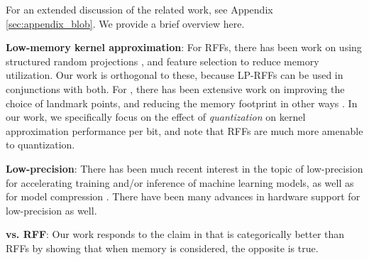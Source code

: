 For an extended discussion of the related work, see Appendix \ref{sec:appendix_blob}. We provide a brief overview here.

\textbf{Low-memory kernel approximation}: For RFFs, there has been work on using structured random projections \citep{fastfood,yu15,sphereRKS}, and feature selection \citep{sparseRKS, may2016} to reduce memory utilization. Our work is orthogonal to these, because LP-RFFs can be used in conjunctions with both. For \NystromNS, there has been extensive work on improving the choice of landmark points, and reducing the memory footprint in other ways \cite{ensemble09,fastpred14,meka14}. In our work, we specifically focus on the effect of \textit{quantization} on kernel approximation performance per bit, and note that RFFs are much more amenable to quantization. 

\textbf{Low-precision}: There has been much recent interest in the topic of low-precision for accelerating training and/or inference of machine learning models, as well as for model compression \citep{gupta15,hogwild15,hubara16,halp18,desa17,han15}.  There have been many advances in hardware support for low-precision as well\citep{tpu17,brainwave17}.

\textbf{\Nystrom vs. RFF}: Our work responds to the claim in \citet{nysvsrff12} that \Nystrom is categorically better than RFFs by showing that when memory is considered, the opposite is true.

